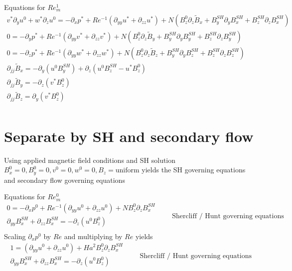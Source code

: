 \documentclass[11pt]{article}
\newcommand{\BS}{B^{SH}}
\newcommand{\BT}{\tilde{B}}
\newcommand{\PD}{\partial}
\begin{document}
Equations for $Re_m^1 $
\small\begin{equation}\begin{aligned}
v^* \PD_y u^0 + w^* \PD_z u^0 = -\PD_x p^*+ Re^{-1} (\PD_{yy} u^* + \PD_{zz} u^*) + N ( B_z^0 \PD_z \BT_x + \BS_y \PD_y \BS_x + \BS_z \PD_z \BS_x ) \\
0                             = -\PD_y p^*+ Re^{-1} (\PD_{yy} v^* + \PD_{zz} v^*) + N ( B_z^0 \PD_z \BT_y + \BS_y \PD_y \BS_y + \BS_z \PD_z \BS_y ) \\
0                             = -\PD_z p^*+ Re^{-1} (\PD_{yy} w^* + \PD_{zz} w^*) + N ( B_z^0 \PD_z \BT_z + \BS_y \PD_y \BS_z + \BS_z \PD_z \BS_z ) \\
\PD_{jj} \BT_x =-\PD_y ( u^0 \BS_y) + \PD_z ( u^0 \BS_z - u^* B_z^0) \\
\PD_{jj} \BT_y =-\PD_z ( v^* B_z^0) \\
\PD_{jj} \BT_z = \PD_y ( v^* B_z^0) \\
\end{aligned}\end{equation}\normalsize

\section{Separate by SH and secondary flow}
Using applied magnetic field conditions and SH solution $B_x^0=0,B_y^0=0,v^0=0,w^0=0,B_z=\text{uniform}$ yields the SH governing equations and secondary flow governing equations

Equations for $Re_m^0$
\begin{equation}\boxed{\begin{aligned}
0 = -\PD_x p^0 + Re^{-1} (\PD_{yy} u^0 + \PD_{zz} u^0) + N B_z^0 \PD_z \BS_x \\
\PD_{yy} \BS_x + \PD_{zz} \BS_x = - \PD_z (u^0 B_z^0) \\
\end{aligned}} \qquad \text{Shercliff / Hunt governing equations}\end{equation}
Scaling $\PD_x p^0$ by $Re$ and multiplying by $Re$ yields
\begin{equation}\boxed{\begin{aligned}
1 = (\PD_{yy} u^0 + \PD_{zz} u^0) + Ha^2 B_z^0 \PD_z \BS_x \\
\PD_{yy} \BS_x + \PD_{zz} \BS_x = - \PD_z (u^0 B_z^0) \\
\end{aligned}} \qquad \text{Shercliff / Hunt governing equations}\end{equation}
\end{document}

